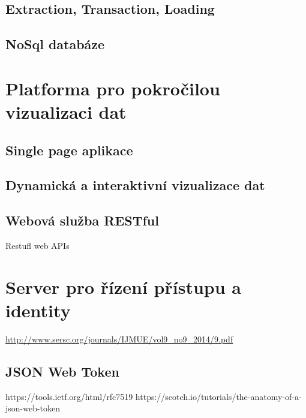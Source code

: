 \subsection{Extraction, Transaction, Loading}

\subsection{NoSql databáze}
\cite{nosql}

\section{Platforma pro pokročilou vizualizaci dat}
\subsection{Single page aplikace}
\subsection{Dynamická a interaktivní vizualizace dat}
\subsection{Webová služba RESTful}
Restufl web APIs

\section{Server pro řízení přístupu a identity}
\url{http://www.sersc.org/journals/IJMUE/vol9_no9_2014/9.pdf}

\subsection{JSON Web Token}
https://tools.ietf.org/html/rfc7519
https://scotch.io/tutorials/the-anatomy-of-a-json-web-token
